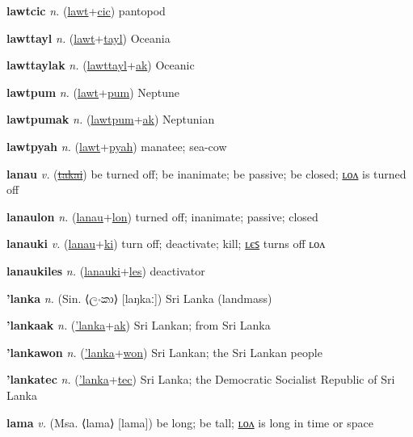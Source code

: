 \textbf{\hypertarget{lawtcic}{lawtcic}} \textit{n.} (\hyperlink{lawt}{lawt}+\allowbreak \hyperlink{cic}{cic})
pantopod

\textbf{\hypertarget{lawttayl}{lawttayl}} \textit{n.} (\hyperlink{lawt}{lawt}+\allowbreak \hyperlink{tayl}{tayl})
Oceania

\textbf{\hypertarget{lawttaylak}{lawttaylak}} \textit{n.} (\hyperlink{lawttayl}{lawttayl}+\allowbreak \hyperlink{ak}{ak})
Oceanic

\textbf{\hypertarget{lawtpum}{lawtpum}} \textit{n.} (\hyperlink{lawt}{lawt}+\allowbreak \hyperlink{pum}{pum})
Neptune

\textbf{\hypertarget{lawtpumak}{lawtpumak}} \textit{n.} (\hyperlink{lawtpum}{lawtpum}+\allowbreak \hyperlink{ak}{ak})
Neptunian

\textbf{\hypertarget{lawtpyah}{lawtpyah}} \textit{n.} (\hyperlink{lawt}{lawt}+\allowbreak \hyperlink{pyah}{pyah})
manatee; sea-cow

\textbf{\hypertarget{lanau}{lanau}} \textit{v.} (\hyperlink{takai}{\sout{takai}})
be turned off; be inanimate; be passive; be closed; \hyperlink{lanaulon}{ʟᴏᴧ} is turned off

\textbf{\hypertarget{lanaulon}{lanaulon}} \textit{n.} (\hyperlink{lanau}{lanau}+\allowbreak \hyperlink{lon}{lon})
turned off; inanimate; passive; closed

\textbf{\hypertarget{lanauki}{lanauki}} \textit{v.} (\hyperlink{lanau}{lanau}+\allowbreak \hyperlink{ki}{ki})
turn off; deactivate; kill; \hyperlink{lanaukiles}{ʟєꜱ} turns off ʟᴏᴧ

\textbf{\hypertarget{lanaukiles}{lanaukiles}} \textit{n.} (\hyperlink{lanauki}{lanauki}+\allowbreak \hyperlink{les}{les})
deactivator

\textbf{\hypertarget{'lanka}{'lanka}} \textit{n.} (Sin. ⟨{\sinhala{}ලංකා}⟩ [laŋkaː])
Sri Lanka (landmass)

\textbf{\hypertarget{'lankaak}{'lankaak}} \textit{n.} (\hyperlink{'lanka}{'lanka}+\allowbreak \hyperlink{ak}{ak})
Sri Lankan; from Sri Lanka

\textbf{\hypertarget{'lankawon}{'lankawon}} \textit{n.} (\hyperlink{'lanka}{'lanka}+\allowbreak \hyperlink{won}{won})
Sri Lankan; the Sri Lankan people

\textbf{\hypertarget{'lankatec}{'lankatec}} \textit{n.} (\hyperlink{'lanka}{'lanka}+\allowbreak \hyperlink{tec}{tec})
Sri Lanka; the Democratic Socialist Republic of Sri Lanka

\textbf{\hypertarget{lama}{lama}} \textit{v.} (Msa. ⟨lama⟩ [lama])
be long; be tall; \hyperlink{lamalon}{ʟᴏᴧ} is long in time or space

